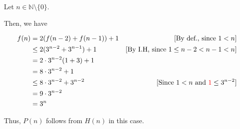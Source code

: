 \documentclass[12pt]{article}
\begin{document}
\begin{mdframed}
    \bigskip

    Let $n \in \mathbb{N} \setminus \{0\}$.

    \bigskip

    Then, we have

    \begin{align}
        f(n) &= 2(f(n-2) + f(n-1)) + 1 & [\text{By def., since $1 < n$}]\\
        &\leq 2(3^{n-2} + 3^{n-1}) + 1 & [\text{By I.H, since $1 \leq n-2 < n-1 < n$}]\\
        &= 2 \cdot 3^{n-2}(1 + 3) + 1\\
        &= 8 \cdot 3^{n-2} + 1 \\
        &\leq 8 \cdot 3^{n-2} + 3^{n-2} & [\text{Since $1 < n$ and $\color{red}1\color{black} \leq 3^{n-2}$}]\\
        &= 9 \cdot 3^{n-2}\\
        &= 3^n
    \end{align}

    \bigskip

    Thus, $P(n)$ follows \color{red}from $H(n)$ in this case\color{black}.

\end{mdframed}











\end{document}
